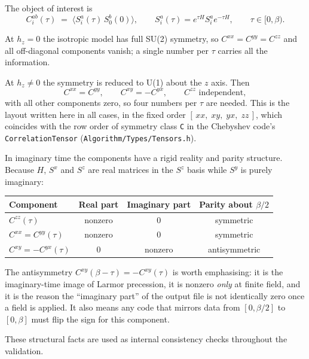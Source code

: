 \documentclass[11pt,a4paper]{article}
\newcommand{\code}[1]{\texttt{#1}}
\begin{document}
The object of interest is
\begin{equation}
  C^{ab}_i(\tau) \;=\; \bigl\langle S^a_i(\tau)\, S^b_0(0) \bigr\rangle,
  \qquad
  S^a_i(\tau) = e^{\tau H} S^a_i e^{-\tau H},
  \qquad \tau\in[0,\beta).
\end{equation}

At $h_z=0$ the isotropic model has full SU(2) symmetry, so
$C^{xx}=C^{yy}=C^{zz}$ and all off-diagonal components vanish; a single number
per $\tau$ carries all the information.

At $h_z\neq0$ the symmetry is reduced to U(1) about the $z$ axis. Then
\begin{equation}
  C^{xx}=C^{yy}, \qquad C^{xy}=-C^{yx}, \qquad C^{zz} \text{ independent},
\end{equation}
with all other components zero, so four numbers per $\tau$ are needed. This is
the layout written here in all cases, in the fixed order
$[\,xx,\;xy,\;yx,\;zz\,]$, which coincides with the row order of symmetry class
\code{C} in the Chebyshev code's \code{CorrelationTensor}
(\code{Algorithm/Types/Tensors.h}).

In imaginary time the components have a rigid reality and parity structure.
Because $H$, $S^x$ and $S^z$ are real matrices in the $S^z$ basis while $S^y$ is
purely imaginary:
\begin{center}
\begin{tabular}{lccc}
\toprule
Component & Real part & Imaginary part & Parity about $\beta/2$ \\
\midrule
$C^{zz}(\tau)$          & nonzero & $0$     & symmetric \\
$C^{xx}=C^{yy}(\tau)$   & nonzero & $0$     & symmetric \\
$C^{xy}=-C^{yx}(\tau)$  & $0$     & nonzero & antisymmetric \\
\bottomrule
\end{tabular}
\end{center}

The antisymmetry $C^{xy}(\beta-\tau) = -C^{xy}(\tau)$ is worth emphasising: it is
the imaginary-time image of Larmor precession, it is nonzero \emph{only} at
finite field, and it is the reason the ``imaginary part'' of the output file is
not identically zero once a field is applied. It also means any code that
mirrors data from $[0,\beta/2]$ to $[0,\beta]$ must flip the sign for this
component.

These structural facts are used as internal consistency checks throughout the
validation.
\end{document}
